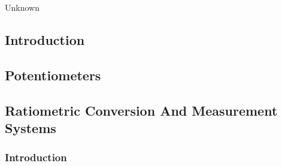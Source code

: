 \chapter[\csoconeshorttitle{}]{\csoconelongtitle{}}

\label{csoc1}

                     {Unknown}

\section{Introduction}
\label{csoc1:sint0}


\section{Potentiometers}
\label{csoc1:spot0}


\section{Ratiometric Conversion And Measurement Systems}
\label{csoc1:srcs0}



\subsection{Introduction}
\label{csoc1:srcs0:sint0}





